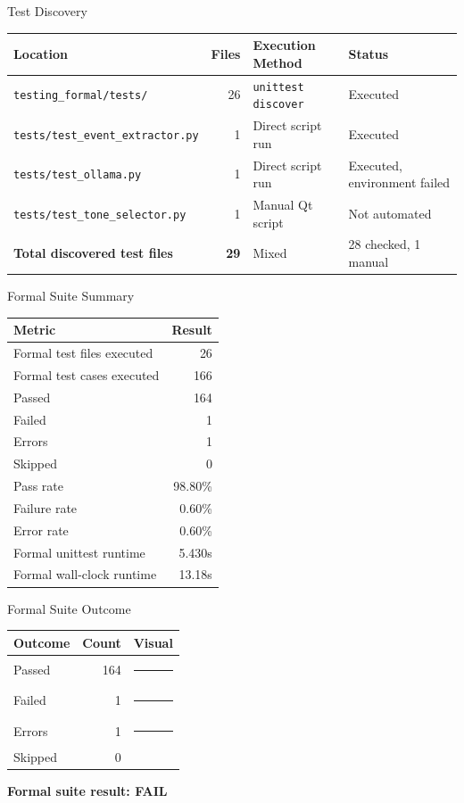 \begin{frame}{Test Discovery}
\scriptsize
\begin{tabular}{p{} r p{} p{}}
\hline
\textbf{Location} & \textbf{Files} & \textbf{Execution Method} & \textbf{Status}\\
\hline
\texttt{testing\_formal/tests/} & 26 & \texttt{unittest discover} & Executed\\
\texttt{tests/test\_event\_extractor.py} & 1 & Direct script run & Executed\\
\texttt{tests/test\_ollama.py} & 1 & Direct script run & Executed, environment failed\\
\texttt{tests/test\_tone\_selector.py} & 1 & Manual Qt script & Not automated\\
\hline
\textbf{Total discovered test files} & \textbf{29} & Mixed & 28 checked, 1 manual\\
\hline
\end{tabular}
\end{frame}

\begin{frame}{Formal Suite Summary}
\small
\begin{tabular}{lr}
\hline
\textbf{Metric} & \textbf{Result}\\
\hline
Formal test files executed & 26\\
Formal test cases executed & 166\\
Passed & 164\\
Failed & 1\\
Errors & 1\\
Skipped & 0\\
Pass rate & 98.80\%\\
Failure rate & 0.60\%\\
Error rate & 0.60\%\\
Formal unittest runtime & 5.430s\\
Formal wall-clock runtime & 13.18s\\
\hline
\end{tabular}
\end{frame}

\begin{frame}{Formal Suite Outcome}
\small
\begin{tabular}{lrl}
\hline
\textbf{Outcome} & \textbf{Count} & \textbf{Visual}\\
\hline
Passed & 164 & \rule{9.8cm}{0.55em}\\
Failed & 1 & \rule{0.2cm}{0.55em}\\
Errors & 1 & \rule{0.2cm}{0.55em}\\
Skipped & 0 & \rule{0cm}{0.55em}\\
\hline
\end{tabular}

\vspace{0.4cm}
\textbf{Formal suite result: FAIL}
\end{frame}

